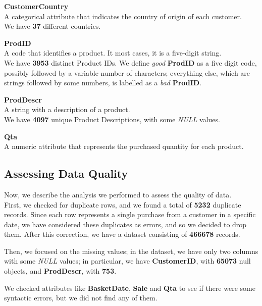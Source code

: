 \textbf{CustomerCountry}\\
A categorical attribute that indicates the country of origin of each customer.\\
We have \textbf{37} different countries.

\textbf{ProdID}\\
A code that identifies a product.
It most cases, it is a five-digit string.\\
We have \textbf{3953} distinct Product IDs.
We define \emph{good} \textbf{ProdID} as a five digit code, possibly followed by a variable number of characters; everything else, which are strings followed by some numbers, is labelled as a \emph{bad} \textbf{ProdID}.

\textbf{ProdDescr}\\  
A string with a description of a product.\\
We have \textbf{4097} unique Product Descriptions, with some \emph{NULL} values.

\textbf{Qta}\\
A numeric attribute that represents the purchased quantity for each product.

\subsection{Assessing Data Quality}
Now, we describe the analysis we performed to assess the quality of data.\\
First, we checked for duplicate rows, and we found a total of \textbf{5232} duplicate records. Since each row represents a single purchase from a customer in a specific date, we have considered these duplicates as errors, and so we decided to drop them. After this correction, we have a dataset consisting of \textbf{466678} records.

Then, we focused on the missing values; in the dataset, we have only two columns with some \emph{NULL} values; in particular, we have \textbf{CustomerID}, with \textbf{65073} null objects, and \textbf{ProdDescr}, with \textbf{753}.

We checked attributes like \textbf{BasketDate}, \textbf{Sale} and \textbf{Qta} to see if there were some syntactic errors, but we did not find any of them.

